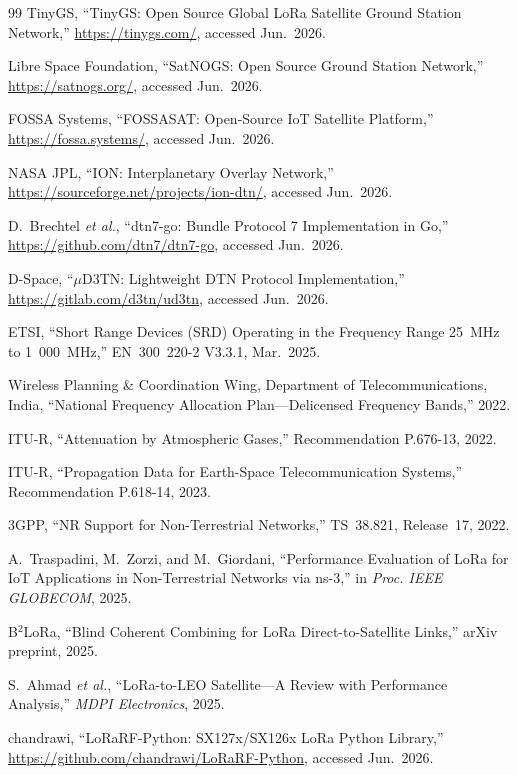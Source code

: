 \documentclass[11pt,a4paper]{article}
\begin{document}
\begin{thebibliography}{99}
TinyGS, ``TinyGS: Open Source Global LoRa Satellite Ground Station Network,'' \url{https://tinygs.com/}, accessed Jun.~2026.

Libre Space Foundation, ``SatNOGS: Open Source Ground Station Network,'' \url{https://satnogs.org/}, accessed Jun.~2026.

FOSSA Systems, ``FOSSASAT: Open-Source IoT Satellite Platform,'' \url{https://fossa.systems/}, accessed Jun.~2026.

NASA JPL, ``ION: Interplanetary Overlay Network,'' \url{https://sourceforge.net/projects/ion-dtn/}, accessed Jun.~2026.

D.~Brechtel \emph{et al.}, ``dtn7-go: Bundle Protocol 7 Implementation in Go,'' \url{https://github.com/dtn7/dtn7-go}, accessed Jun.~2026.

D-Space, ``$\mu$D3TN: Lightweight DTN Protocol Implementation,'' \url{https://gitlab.com/d3tn/ud3tn}, accessed Jun.~2026.

ETSI, ``Short Range Devices (SRD) Operating in the Frequency Range 25~MHz to 1~000~MHz,'' EN~300~220-2 V3.3.1, Mar.~2025.

Wireless Planning \& Coordination Wing, Department of Telecommunications, India, ``National Frequency Allocation Plan---Delicensed Frequency Bands,'' 2022.

ITU-R, ``Attenuation by Atmospheric Gases,'' Recommendation P.676-13, 2022.

ITU-R, ``Propagation Data for Earth-Space Telecommunication Systems,'' Recommendation P.618-14, 2023.

3GPP, ``NR Support for Non-Terrestrial Networks,'' TS~38.821, Release~17, 2022.

A.~Traspadini, M.~Zorzi, and M.~Giordani, ``Performance Evaluation of LoRa for IoT Applications in Non-Terrestrial Networks via ns-3,'' in \emph{Proc. IEEE GLOBECOM}, 2025.

B$^2$LoRa, ``Blind Coherent Combining for LoRa Direct-to-Satellite Links,'' arXiv preprint, 2025.

S.~Ahmad \emph{et al.}, ``LoRa-to-LEO Satellite---A Review with Performance Analysis,'' \emph{MDPI Electronics}, 2025.

chandrawi, ``LoRaRF-Python: SX127x/SX126x LoRa Python Library,'' \url{https://github.com/chandrawi/LoRaRF-Python}, accessed Jun.~2026.

\end{thebibliography}
\end{document}
